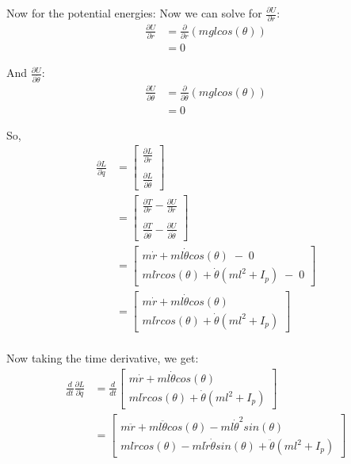 Now for the potential energies:
Now we can solve for $\frac{\partial U}{\partial \dot{r}}$:
\begin{align}
	\frac{\partial U}{\partial \dot{r}} &= \frac{\partial}{\partial \dot{r}} (mglcos(\theta)) \\
	&= 0
\end{align}

And $\frac{\partial U}{\partial \dot{\theta}}$:
\begin{align}
	\frac{\partial U}{\partial \dot{\theta}} &= \frac{\partial}{\partial \dot{\theta}} (mglcos(\theta)) \\
	&= 0
\end{align}

So,
\begin{align}
	\frac{\partial L}{\partial \dot{q}} &= \begin{bmatrix}\frac{\partial L}{\partial \dot{r}} \\ \\ \frac{\partial L}{\partial \dot{\theta}}\end{bmatrix} \\
	&= \begin{bmatrix}\frac{\partial T}{\partial \dot{r}} - \frac{\partial U}{\partial \dot{r}} \\ \\
	\frac{\partial T}{\partial \dot{\theta}} - \frac{\partial U}{\partial \dot{\theta}} \end{bmatrix} \\
	&= \begin{bmatrix}m\dot{r} + ml\dot{\theta}cos(\theta) \; - \; 0 \\
		ml\dot{r}cos(\theta) + \dot{\theta}(ml^2 + I_p) \; - \; 0\end{bmatrix} \\
	&= \begin{bmatrix}m\dot{r} + ml\dot{\theta}cos(\theta) \\
		ml\dot{r}cos(\theta) + \dot{\theta}(ml^2 + I_p)\end{bmatrix} \\
\end{align}

Now taking the time derivative, we get:
\begin{align}
	\frac{d}{dt} \frac{\partial L}{\partial \dot{q}} &= \frac{d}{dt} \begin{bmatrix}m\dot{r} + ml\dot{\theta}cos(\theta) \\
	ml\dot{r}cos(\theta) + \dot{\theta}(ml^2 + I_p)\end{bmatrix} \\
	&= \begin{bmatrix} m\ddot{r} + ml\ddot{\theta}cos(\theta) - ml\dot{\theta}^2sin(\theta) \\
		ml\ddot{r}cos(\theta) - ml\dot{r}\dot{\theta}sin(\theta) + \ddot{\theta}(ml^2 + I_p) \end{bmatrix}
\end{align}

